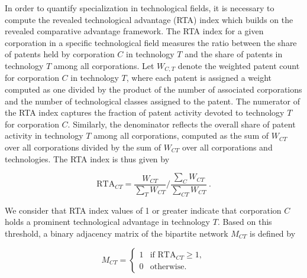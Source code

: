 In order to quantify specialization in technological fields, it is necessary to compute the revealed technological advantage (RTA)\cite{Soete1987} index which builds on the revealed comparative advantage framework\cite{Balassa1965}.
The RTA index for a given corporation in a specific technological field measures the ratio between the share of patents held by corporation \(C\) in technology \(T\) and the share of patents in technology \(T\) among all corporations.
Let \(W_{C,T}\) denote the weighted patent count for corporation \(C\) in technology \(T\), where each patent is assigned a weight computed as one divided by the product of the number of associated corporations and the number of technological classes assigned to the patent.
The numerator of the RTA index captures the fraction of patent activity devoted to technology \(T\) for corporation \(C\). 
Similarly, the denominator reflects the overall share of patent activity in technology \(T\) among all corporations, computed as the sum of \(W_{CT}\) over all corporations divided by the sum of \(W_{CT}\) over all corporations and technologies.
The RTA index is thus given by

\begin{center} \label{eq1}
    \begin{equation}
    \mbox{RTA}_{CT} = \frac{W_{CT}}{\sum_{T} W_{CT}} \Bigg/ \frac{\sum_{C} W_{CT}}{\sum_{CT} W_{CT}}~.
    \end{equation}
\end{center}
We consider that RTA index values of 1 or greater indicate that corporation \(C\) holds a prominent technological advantage in technology \(T\). Based on this threshold, a binary adjacency matrix of the bipartite network \(M_{CT}\) is defined by

\begin{center}
\begin{equation} \label{eq2}
M_{CT} = 
\begin{cases} 
1 & \text{if } \mbox{RTA}_{CT} \geq 1, \\
0 & \text{otherwise}.
\end{cases}
\end{equation}
\end{center}
